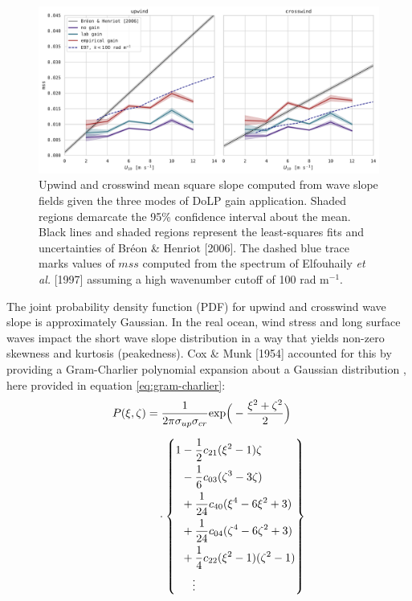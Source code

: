 \documentclass[letterpaper,journal]{IEEEtran}
\begin{document}
\begin{figure}[!ht]
    \centering
    \includegraphics[width=\textwidth]{_figures/mss_upwind_crosswind.pdf}
    \vspace{-20pt}
    \caption{Upwind and crosswind mean square slope computed from wave slope fields given the three modes of DoLP gain application. Shaded regions demarcate the 95\% confidence interval about the mean. Black lines and shaded regions represent the least-squares fits and uncertainties of Br\'eon \& Henriot [2006]. The dashed blue trace marks values of $mss$ computed from the spectrum of Elfouhaily \emph{et al.} [1997] \cite{Elfouhaily1997} assuming a high wavenumber cutoff of 100 rad m$^{-1}$.}
    \label{fig:mss_upwind_crosswind}
    \vspace{-10pt}
\end{figure}

The joint probability density function (PDF) for upwind and crosswind wave slope is approximately Gaussian. In the real ocean, wind stress and long surface waves impact the short wave slope distribution in a way that yields non-zero skewness and kurtosis (peakedness). Cox \& Munk [1954] accounted for this by providing a Gram-Charlier polynomial expansion about a Gaussian distribution \cite{Cox1954a}, here provided in equation \ref{eq:gram-charlier}:
\begin{align}\label{eq:gram-charlier}
\begin{split}
P(\xi,\zeta)
  &= \frac{1}{2\pi\sigma_{up}\sigma_{cr}}\mathrm{exp}\Big(-\frac{\xi^2+\zeta^2}{2}\Big)          \\[6pt]
  &\quad\hfill
     \cdot\left\{
     \begin{aligned}
       1 &- \frac{1}{2}c_{21}(\xi^2-1)\zeta\\
       &- \frac{1}{6}c_{03}(\zeta^3-3\zeta)\\
       &+ \frac{1}{24}c_{40}(\xi^4-6\xi^2+3)\\
       &+ \frac{1}{24}c_{04}(\zeta^4-6\zeta^2+3)\\
       &+ \frac{1}{4}c_{22}(\xi^2-1)(\zeta^2-1)\\
       &\quad\vdots
     \end{aligned}
     \right\}
\end{split}
\end{align}
\end{document}
